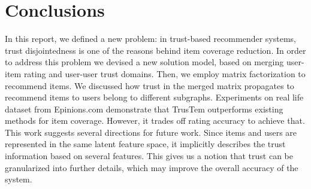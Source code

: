 \documentclass[11pt, conference, onecolumn]{IEEEtran}
\begin{document}
\section{Conclusions}
In this report, we defined a new problem: in trust-based recommender systems, trust disjointedness is one of the reasons behind item coverage reduction. In order to address this problem we devised a new solution model, based on merging user-item rating and user-user trust domains. Then, we employ matrix factorization to recommend items. We discussed how trust in the merged matrix propagates to recommend items to users belong to different subgraphs. 
Experiments on real life dataset from Epinions.com demonstrate that TrusTem outperforms existing methods for item coverage. However, it trades off rating accuracy to achieve that. This work suggests several directions for future work. Since items and users are represented in the same latent feature space, it implicitly describes the trust information based on several features. This gives us a notion that trust can be granularized into further details, which may improve the overall accuracy of the system. 

   
    
\end{document}
